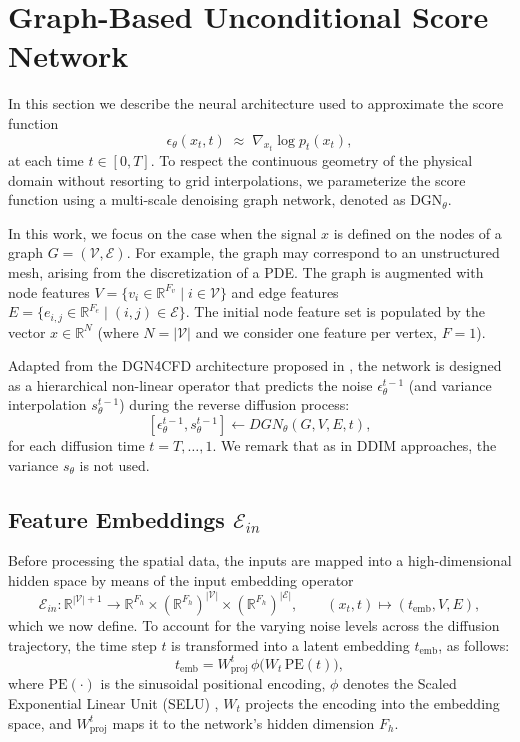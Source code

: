 \documentclass[a4paper,11pt]{article}
\renewcommand{\varepsilon}{\epsilon}
\newcommand{\R}{{\mathbb R}}
\theoremstyle{definition}
\theoremstyle{plain}
\theoremstyle{remark}
\begin{document}
\section{Graph-Based Unconditional Score Network}
\label{sec:graph_network}

In this section we describe the neural architecture used to approximate the score
function
\[
\varepsilon_\theta(x_t, t)
\;\approx\;
\nabla_{x_t} \log p_t(x_t),
\]
at each time $t \in [0,T]$.
To respect the continuous geometry of the physical domain without resorting to grid interpolations, we parameterize the score function using a multi-scale denoising graph network, denoted as $\text{DGN}_{\theta}$.

In this work, we focus on the case when the signal $x$ is defined on the nodes of a graph 
 $G = (\mathcal{V},\mathcal{E})$. 
 For example, the graph may correspond to an unstructured mesh, arising from the discretization of a PDE. The graph is augmented with node features $V = \{ v_i \in \mathbb{R}^{F_v} \mid i \in \mathcal{V} \}$ and edge features $E = \{ e_{i,j} \in \mathbb{R}^{F_e} \mid (i,j) \in \mathcal{E} \}$. The initial node feature set is populated by the vector $x \in \mathbb{R}^{N}$ (where $N = |\mathcal{V}|$ and we consider one feature per vertex, $F=1$).

Adapted from the DGN4CFD architecture proposed in \cite{LINO2025}, the network is designed as a hierarchical non-linear operator that predicts the noise $\epsilon_\theta^{t-1}$ (and variance interpolation $s_\theta^{t-1}$) during the reverse diffusion process:
\begin{equation}
\label{eq:dgneq}
[ \epsilon_{\theta}^{t-1}, s_{\theta}^{t-1}] \leftarrow DGN_{\theta}(G, V, E, t),
\end{equation}
for each diffusion time $t=T,\ldots,1.$
We remark that as in DDIM approaches, the variance  $ s_{\theta}$ is not used.


\subsection{Feature Embeddings $\mathcal{E}_{in}$}
Before processing the spatial data, the inputs are mapped into a high-dimensional hidden space by means of the input embedding operator 
\[
\mathcal{E}_{in}\colon \R^{|\mathcal{V}|+1}\to \R^{F_h}\times (\R^{F_h})^{|\mathcal{V}|}\times (\R^{F_h})^{|\mathcal{E}|},\qquad (x_t, t) \mapsto (t_{\mathrm{emb}},V,E),
\]
 which we now define. 
To account for the varying noise levels across the diffusion trajectory, the time step $t$ is transformed into a latent embedding $t_{\mathrm{emb}}$, as follows:
\begin{equation}
t_{\mathrm{emb}} = W_{\mathrm{proj}}^t\,\phi\bigl(W_t\,\mathrm{PE}(t)\bigr),
\label{eq:temb}
\end{equation}
where $\mathrm{PE}(\cdot)$ is the sinusoidal positional encoding, $\phi$ denotes the Scaled Exponential Linear Unit (SELU) \cite{Tallman2020}, $W_t$ projects the encoding into the embedding space, and $W_{\mathrm{proj}}^t$ maps it to the network's hidden dimension $F_h$.
\end{document}
